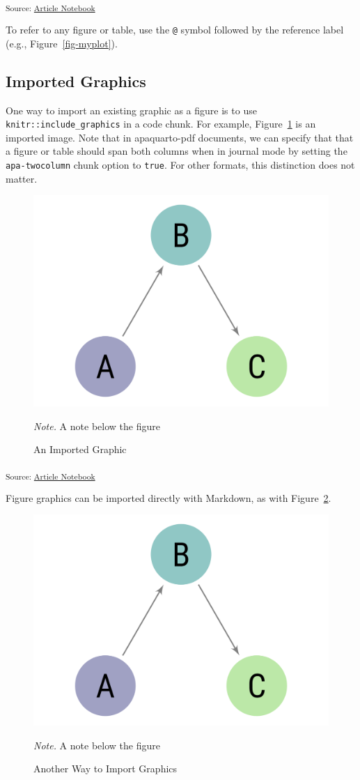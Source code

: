\documentclass[
  jou,
  floatsintext,
  longtable,
  nolmodern,
  notxfonts,
  notimes,
  colorlinks=true,linkcolor=blue,citecolor=blue,urlcolor=blue]{apa7}
\begin{document}
\textsubscript{Source:
\href{https://brainworkup.github.io/srt-manuscript/index.qmd.html}{Article
Notebook}}

To refer to any figure or table, use the \texttt{@} symbol followed by
the reference label (e.g., Figure~\ref{fig-myplot}).

\subsection{Imported Graphics}\label{imported-graphics}

One way to import an existing graphic as a figure is to use
\texttt{knitr::include\_graphics} in a code chunk. For example,
Figure~\ref{fig-import1} is an imported image. Note that in
apaquarto-pdf documents, we can specify that that a figure or table
should span both columns when in journal mode by setting the
\texttt{apa-twocolumn} chunk option to \texttt{true}. For other formats,
this distinction does not matter.

\label{cell-fig-import1}
\begin{figure}[H]

{\caption{{An Imported Graphic}{\label{fig-import1}}}}

\includegraphics[width=0.48\linewidth,height=\textheight,keepaspectratio]{sampleimage.png}

{\noindent \emph{Note.} A note below the figure}

\end{figure}

\textsubscript{Source:
\href{https://brainworkup.github.io/srt-manuscript/index.qmd.html}{Article
Notebook}}

Figure graphics can be imported directly with Markdown, as with
Figure~\ref{fig-import2}.

\begin{figure}[!htbp]

{\caption{{Another Way to Import Graphics}{\label{fig-import2}}}}

\includegraphics[width=0.49\linewidth,height=\textheight,keepaspectratio]{sampleimage.png}

{\noindent \emph{Note.} A note below the figure}

\end{figure}
\end{document}
